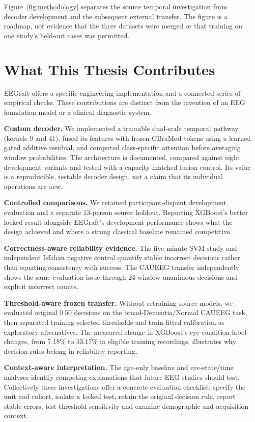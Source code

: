 Figure~\ref{fig:methodology} separates the source temporal investigation from decoder development and the subsequent external transfer. The figure is a roadmap, not evidence that the three datasets were merged or that training on one study's held-out cases was permitted.

\section{What This Thesis Contributes}
EEGraft offers a specific engineering implementation and a connected series of empirical checks. These contributions are distinct from the invention of an EEG foundation model or a clinical diagnostic system.

\textbf{Custom decoder.} We implemented a trainable dual-scale temporal pathway (kernels 9 and 41), fused its features with frozen CBraMod tokens using a learned gated additive residual, and computed class-specific attention before averaging window probabilities. The architecture is documented, compared against eight development variants and tested with a capacity-matched fusion control. Its value is a reproducible, testable decoder design, not a claim that its individual operations are new.

\textbf{Controlled comparisons.} We retained participant-disjoint development evaluation and a separate 13-person source holdout. Reporting XGBoost's better locked result alongside EEGraft's development performance shows what the design achieved and where a strong classical baseline remained competitive.

\textbf{Correctness-aware reliability evidence.} The five-minute SVM study and independent Isfahan negative control quantify stable incorrect decisions rather than equating consistency with success. The CAUEEG transfer independently shows the same evaluation issue through 24-window unanimous decisions and explicit incorrect counts.

\textbf{Threshold-aware frozen transfer.} Without retraining source models, we evaluated original 0.50 decisions on the broad-Dementia/Normal CAUEEG task, then separated training-selected thresholds and train-fitted calibration as exploratory alternatives. The measured change in XGBoost's eye-condition label changes, from 7.18\% to 33.17\% in eligible training recordings, illustrates why decision rules belong in reliability reporting.

\textbf{Context-aware interpretation.} The age-only baseline and eye-state/time analyses identify competing explanations that future EEG studies should test. Collectively these investigations offer a concrete evaluation checklist: specify the unit and cohort, isolate a locked test, retain the original decision rule, report stable errors, test threshold sensitivity and examine demographic and acquisition context.

